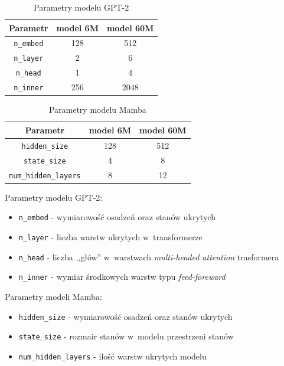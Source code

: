 \documentclass[data-science]{agh-wi} %
\begin{document}
\begin{table}[!htb]
    \caption{Parametry modelu GPT-2}
    \centering
    \begin{tabular}{||c c c||}
        \hline
        Parametr          & model 6M & model 60M \\ [0.5ex]
        \hline\hline
        \texttt{n\_embed} & 128      & 512       \\
        \hline
        \texttt{n\_layer} & 2        & 6         \\
        \hline
        \texttt{n\_head}  & 1        & 4         \\
        \hline
        \texttt{n\_inner} & 256      & 2048      \\
        \hline
    \end{tabular}
\end{table}

\begin{table}[!htb]
    \caption{Parametry modelu Mamba}
    \centering
    \begin{tabular}{||c c c||}
        \hline
        Parametr                     & model 6M & model 60M \\ [0.5ex]
        \hline\hline
        \texttt{hidden\_size}        & 128      & 512       \\
        \hline
        \texttt{state\_size}         & 4        & 8         \\
        \hline
        \texttt{num\_hidden\_layers} & 8        & 12        \\
        \hline
    \end{tabular}
\end{table}

Parametry modelu GPT-2:
\begin{itemize}
    \item \texttt{n\_embed} - wymiarowość osadzeń oraz stanów ukrytych
    \item \texttt{n\_layer} - liczba warstw ukrytych w~transformerze
    \item \texttt{n\_head} - liczba ,,głów'' w~warstwach \textit{multi-headed attention} trasformera
    \item \texttt{n\_inner} - wymiar środkowych warstw typu \textit{feed-foreward}
\end{itemize}

Parametry modeli Mamba:
\begin{itemize}
    \item \texttt{hidden\_size} - wymiarowość osadzeń oraz stanów ukrytych
    \item \texttt{state\_size} -  rozmair stanów w~modelu przestrzeni stanów
    \item \texttt{num\_hidden\_layers} - ilość warstw ukrytych modelu
\end{itemize}
\end{document}
